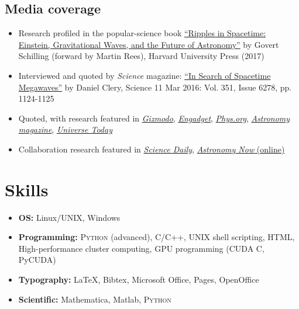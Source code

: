 \documentclass[11pt,letterpaper,sans]{moderncv}
\begin{document}
\subsection{Media coverage}
\begin{itemize}[leftmargin=8mm]
\item Research profiled in the popular-science book {\color{color1} \href{https://books.google.com/books/about/Ripples_in_Spacetime.html?id=YicuDwAAQBAJ&hl=en}{``Ripples in Spacetime: Einstein, Gravitational Waves, and the Future of Astronomy''}} by Govert Schilling (forward by Martin Rees), Harvard University Press (2017)
\item Interviewed and quoted by \textit{Science} magazine: {\color{color1} \href{http://science.sciencemag.org/content/351/6278/1124}{``In Search of Spacetime Megawaves''}} by Daniel Clery, Science  11 Mar 2016: Vol. 351, Issue 6278, pp. 1124-1125
\item Quoted, with research featured in {\color{color1} \href{http://gizmodo.com/we-could-find-even-more-gravitational-waves-soon-with-p-1761021828}{\textit{Gizmodo}}}, {\color{color1} \href{https://www.engadget.com/2016/02/25/pulsars-gravitational-waves-black-holes/}{\textit{Engadget}}}, {\color{color1} \href{http://phys.org/news/2016-02-pulsar-web-low-frequency-gravitational.html}{\textit{Phys.org}}},  {\color{color1} \href{http://www.astronomy.com/news/2016/02/pulsar-web-could-detect-gravitational-waves}{\textit{Astronomy magazine}}}, {\color{color1} \href{http://www.universetoday.com/127562/the-future-of-gravitational-wave-astronomy-enhanced-ligo-pulsar-webs-space-interferometers-and-everything/}{\textit{Universe Today}}}
\item Collaboration research featured in {\color{color1} \href{https://www.sciencedaily.com/releases/2016/04/160405122609.htm}{\textit{Science Daily}}}, {\color{color1} \href{https://astronomynow.com/2016/04/06/gravitational-wave-search-provides-insights-into-galaxy-mergers/}{\textit{Astronomy Now} (online)}}
\end{itemize}

\vspace{-2mm}
\section{Skills}
\begin{itemize}[leftmargin=8mm]
\item \textbf{OS:} Linux/UNIX, Windows
\item \textbf{Programming:} \textsc{Python} (advanced), C/C++, UNIX shell scripting, HTML, High-performance cluster computing, GPU programming (CUDA C, PyCUDA)
\item \textbf{Typography:} \LaTeX, Bibtex, Microsoft Office, Pages, OpenOffice 
\item \textbf{Scientific:} Mathematica, Matlab, \textsc{Python}
\end{itemize}
\end{document}
